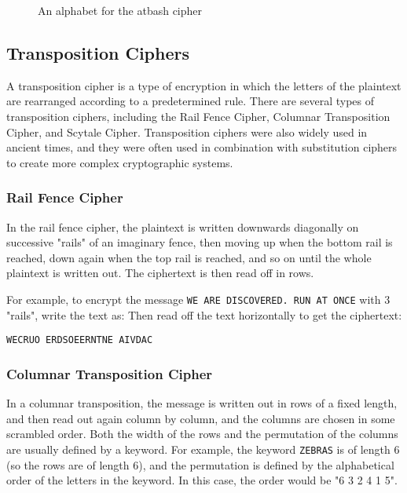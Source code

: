 \documentclass[11pt,a4paper]{report}
\begin{document}
\begin{figure}[h]
\caption{An alphabet for the atbash cipher}
\end{figure}



\subsection{Transposition Ciphers}

A transposition cipher is a type of encryption in which the letters of the plaintext are rearranged according to a predetermined rule. There are several types of transposition ciphers, including the Rail Fence Cipher, Columnar Transposition Cipher, and Scytale Cipher. Transposition ciphers were also widely used in ancient times, and they were often used in combination with substitution ciphers to create more complex cryptographic systems.

\subsubsection{Rail Fence Cipher}

In the rail fence cipher, the plaintext is written downwards diagonally on successive "rails" of an imaginary fence, then moving up when the bottom rail is reached, down again when the top rail is reached, and so on until the whole plaintext is written out. The ciphertext is then read off in rows.

For example, to encrypt the message \verb|WE ARE DISCOVERED. RUN AT ONCE| with 3 "rails", write the text as:
Then read off the text horizontally to get the ciphertext:

\verb|WECRUO ERDSOEERNTNE AIVDAC|

\subsubsection{Columnar Transposition Cipher}

In a columnar transposition, the message is written out in rows of a fixed length, and then read out again column by column, and the columns are chosen in some scrambled order. Both the width of the rows and the permutation of the columns are usually defined by a keyword. For example, the keyword \verb|ZEBRAS| is of length 6 (so the rows are of length 6), and the permutation is defined by the alphabetical order of the letters in the keyword. In this case, the order would be "6 3 2 4 1 5".
\end{document}
